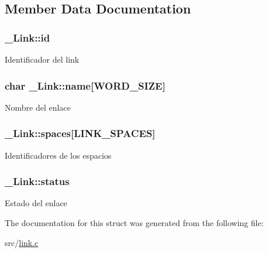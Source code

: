 \subsection{Member Data Documentation}
\hypertarget{struct__Link_a151212e7a8e8274c2a1ee991ba95878b}{
\subsubsection[{id}]{ \+\_\+\+Link\+::id}}\label{struct__Link_a151212e7a8e8274c2a1ee991ba95878b}
Identificador del link \hypertarget{struct__Link_a655f0a5d235d1fd6797299dd4763672b}{
\subsubsection[{name}]{\setlength{\rightskip}{0pt plus 5cm}char \+\_\+\+Link\+::name\mbox{[}{\bf W\+O\+R\+D\+\_\+\+S\+I\+Z\+E}\mbox{]}}}\label{struct__Link_a655f0a5d235d1fd6797299dd4763672b}
Nombre del enlace \hypertarget{struct__Link_a05724c89a2945c364f76302d1bcd3196}{
\subsubsection[{spaces}]{ \+\_\+\+Link\+::spaces\mbox{[}L\+I\+N\+K\+\_\+\+S\+P\+A\+C\+E\+S\mbox{]}}}\label{struct__Link_a05724c89a2945c364f76302d1bcd3196}
Identificadores de los espacios \hypertarget{struct__Link_a4d1168b16e3b3c297a6e7b096ff8b9f7}{
\subsubsection[{status}]{ \+\_\+\+Link\+::status}}\label{struct__Link_a4d1168b16e3b3c297a6e7b096ff8b9f7}
Estado del enlace 

The documentation for this struct was generated from the following file\+:\begin{DoxyCompactItemize}
\item 
src/\hyperlink{link_8c}{link.\+c}\end{DoxyCompactItemize}
